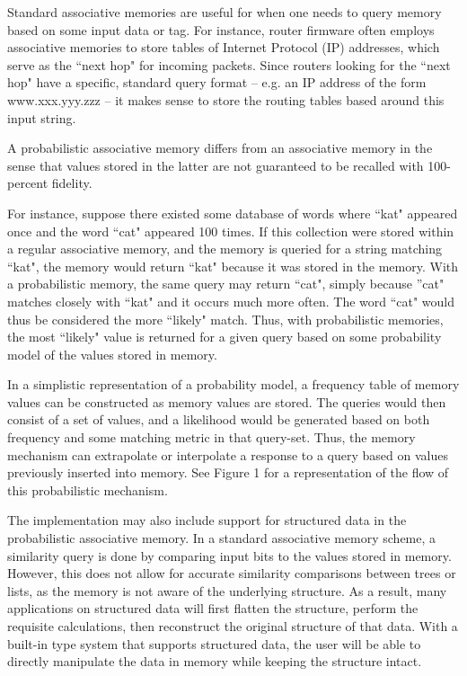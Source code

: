 \documentclass{sig-alternate}
\begin{document}
Standard associative memories are useful for when one needs to query memory based 
on some input data or tag. For instance, router firmware often employs associative 
memories to store tables of Internet Protocol (IP) addresses, which serve as the ``next hop" for incoming 
packets. Since routers looking for the ``next hop" have a specific, standard query 
format -- e.g. an IP address of the form www.xxx.yyy.zzz -- it makes sense to store the 
routing tables based around this input string.

A probabilistic associative memory differs from an associative memory in the sense that 
values stored in the latter are not guaranteed to be recalled with 100-percent fidelity.

For instance, suppose there existed some database of words where ``kat" appeared once and the word ``cat" appeared 100 times.
If this collection were stored within a regular associative memory, and the memory is queried for a string matching ``kat", the memory 
would return ``kat" because it was stored in the memory. With a probabilistic memory, the same query may return ``cat", simply because 
''cat" matches closely with ``kat" and it occurs much more often. The word ``cat" would thus be considered the more ``likely" match.
Thus, with probabilistic memories, the most ``likely" value is returned for a given query based on some probability model of the values
stored in memory.

In a simplistic representation of a probability model, a frequency table of memory values can be constructed as memory values are stored.
The queries would then consist of a set of values, and a likelihood would be generated based on both frequency and some matching metric in that query-set.
Thus, the memory mechanism can extrapolate or interpolate a response to a query based on values 
previously inserted into memory. 
See Figure 1 for a representation of the flow of this probabilistic mechanism.

The implementation may also include support for structured data in the probabilistic associative memory.
In a standard associative memory scheme, a similarity query is done by comparing input bits
to the values stored in memory. However, this does not allow for accurate similarity comparisons
between trees or lists, as the memory is not aware of the underlying structure. As a result,
many applications on structured data will first flatten the structure, perform the requisite 
calculations, then reconstruct the original structure of that data. With a built-in type system
that supports structured data, the user will be able to directly manipulate the data in memory 
while keeping the structure intact.
\end{document}
